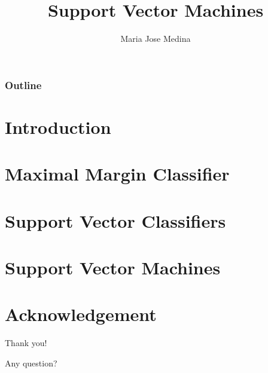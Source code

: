 \documentclass[10pt]{beamer}
\title{Support Vector Machines}%
\author[Maria Jose Medina]{Maria Jose Medina}%
\institute[USACH]{Universidad de Santiago de Chile}
\date[\textcolor{white}{November 2022}]
\begin{document}
\frame{\titlepage}
\begin{frame}
\frametitle{Outline}
\tableofcontents
\end{frame}



\section{Introduction}



\section{Maximal Margin Classifier}


\section{Support Vector Classifiers}


\section{Support Vector Machines}





\section*{Acknowledgement}  
\begin{frame}

\textcolor{myNewColorA}{\huge{\centerline{Thank you!}}}
\vspace*{0.5cm}

\textcolor{myNewColorA}{\Large{\centerline{Any question?}}}
\vspace*{0.5cm}


\end{frame}
\end{document}
